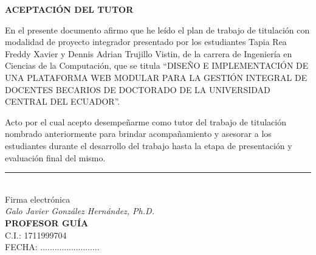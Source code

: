 
\pagestyle{empty}
\onehalfspacing
\fontsize{12}{18}\selectfont

\begin{center}
    \textbf{\Large ACEPTACIÓN DEL TUTOR}
\end{center}

\vspace{1.5cm}

En el presente documento afirmo que he leído el plan de trabajo de titulación con modalidad de proyecto integrador presentado por los estudiantes Tapia Rea Freddy Xavier y Dennis Adrian Trujillo Vistin, de la carrera de Ingeniería en Ciencias de la Computación, que se titula “DISEÑO E IMPLEMENTACIÓN DE UNA PLATAFORMA WEB MODULAR PARA LA GESTIÓN INTEGRAL DE DOCENTES BECARIOS DE DOCTORADO DE LA UNIVERSIDAD CENTRAL DEL ECUADOR”.

\vspace{0.8cm}

Acto por el cual acepto desempeñarme como tutor del trabajo de titulación nombrado anteriormente para brindar acompañamiento y asesorar a los estudiantes durante el desarrollo del trabajo hasta la etapa de presentación y evaluación final del mismo.

\vspace{2.5cm}

\begin{flushleft}
\rule{7.0cm}{0.4pt} \\[0.2cm]
Firma electrónica \\
\textit{Galo Javier González Hernández, Ph.D.} \\
\textbf{PROFESOR GUÍA} \\
C.I.: 1711999704 \\[1.0cm]

FECHA: .........................
\end{flushleft}

\newpage
